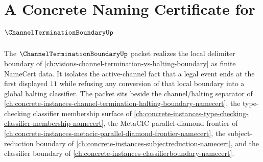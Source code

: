\chapter{A Concrete Naming Certificate for $\ChannelTerminationBoundaryUp$}
\label{ch:concrete-instances-channel-termination-boundary-namecert}

The $\ChannelTerminationBoundaryUp$ packet realizes the local delimiter boundary of \autoref{ch:visions-channel-termination-vs-halting-boundary} as finite NameCert data. It isolates the active-channel fact that a legal event ends at the first displayed $11$ while refusing any conversion of that local boundary into a global halting classifier. The packet sits beside the channel/halting separator of \autoref{ch:concrete-instances-channel-termination-halting-boundary-namecert}, the type-checking classifier membership surface of \autoref{ch:concrete-instances-type-checking-classifier-membership-namecert}, the MetaCIC parallel-diamond frontier of \autoref{ch:concrete-instances-metacic-parallel-diamond-frontier-namecert}, the subject-reduction boundary of \autoref{ch:concrete-instances-subjectreduction-namecert}, and the classifier boundary of \autoref{ch:concrete-instances-classifierboundary-namecert}.

